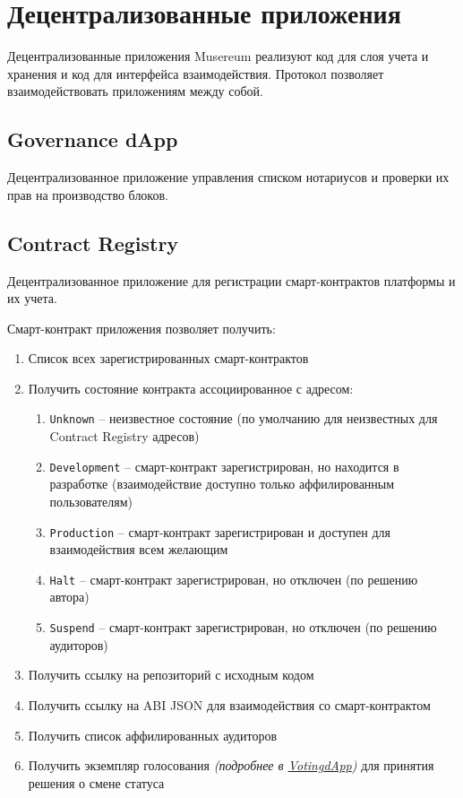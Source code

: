 \documentclass[12pt]{report}
\def\code#1{\colorbox{light-gray}{\texttt{#1}}}
\begin{document}
\section{Децентрализованные приложения}
\label{tech-apps}
Децентрализованные приложения Musereum реализуют код для слоя учета и хранения и код для интерфейса взаимодействия. Протокол позволяет взаимодействовать приложениям между собой.

\subsection{Governance dApp}
\label{tech-apps-governance}
\begin{multicols}{2}
Децентрализованное приложение управления списком нотариусов и проверки их прав на производство блоков.
\end{multicols}

\subsection{Contract Registry}
\label{tech-apps-contracts-registry}
\begin{multicols}{2}
Децентрализованное приложение для регистрации смарт-контрактов платформы и их учета. 

Смарт-контракт приложения позволяет получить:
\begin{enumerate}
	\item Список всех зарегистрированных смарт-контрактов
	\item Получить состояние контракта ассоциированное с адресом:
	\begin{enumerate}
		\item \code{Unknown} – неизвестное состояние (по умолчанию для неизвестных для Contract Registry адресов)
		\item \code{Development} – смарт-контракт зарегистрирован, но находится в разработке (взаимодействие доступно только аффилированным пользователям)
		\item \code{Production} – смарт-контракт зарегистрирован и доступен для взаимодействия всем желающим
		\item \code{Halt} – смарт-контракт зарегистрирован, но отключен (по решению автора) 
		\item \code{Suspend} – смарт-контракт зарегистрирован, но отключен (по решению аудиторов)
	\end{enumerate}
\item Получить ссылку на репозиторий с исходным кодом
\item Получить ссылку на ABI JSON для взаимодействия со смарт-контрактом
\item Получить список аффилированных аудиторов
\item Получить экземпляр голосования \textit{(подробнее в \hyperref[tech-apps-voting]{VotingdApp})} для принятия решения о смене статуса
\end{enumerate}
\end{multicols}
\end{document}
